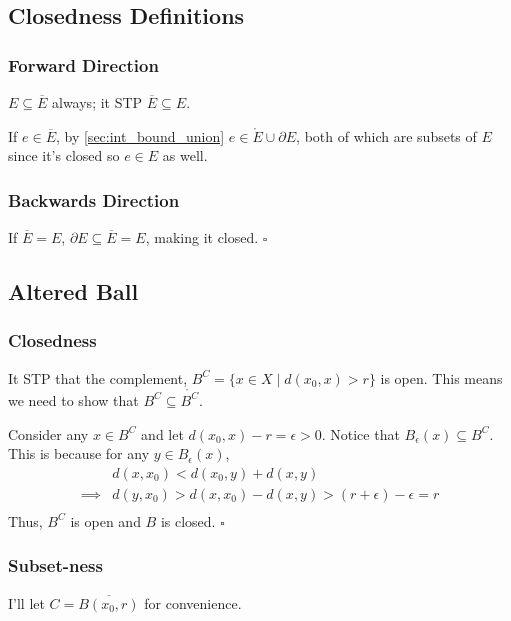 \documentclass[12pt]{article}
\begin{document}
\subsection{Closedness Definitions}

\subsubsection{Forward Direction}

$E \subseteq \overline{E}$ always; it STP $\overline{E} \subseteq E$.

If $e \in \overline{E}$, by \ref{sec:int_bound_union} $e \in \mathring{E} \cup \partial E$,
both of which are subsets of $E$ since it's closed so $e \in E$ as well.

\subsubsection{Backwards Direction}

If $\overline{E}=E$, $\partial E \subseteq \overline{E}=E$, making it closed. $\square$

\subsection{Altered Ball}

\subsubsection{Closedness}

It STP that the complement, $B^C=\{x \in X \mid d(x_0, x) > r\}$ is open.
This means we need to show that $B^C \subseteq \mathring{B^C}$.

Consider any $x \in B^C$ and let $d(x_0, x)-r=\epsilon > 0$.
Notice that $B_{\epsilon}(x) \subseteq B^C$.
This is because for any $y \in B_{\epsilon}(x)$,
\begin{align*}
    & d(x, x_0) < d(x_0, y) + d(x, y) \\
    \implies{} & d(y, x_0) > d(x, x_0) - d(x, y) > (r+\epsilon)-\epsilon = r \\
\end{align*}
Thus, $B^C$ is open and $B$ is closed. $\square$

\subsubsection{Subset-ness}

I'll let $C=\overline{B(x_0, r)}$ for convenience.
\end{document}
